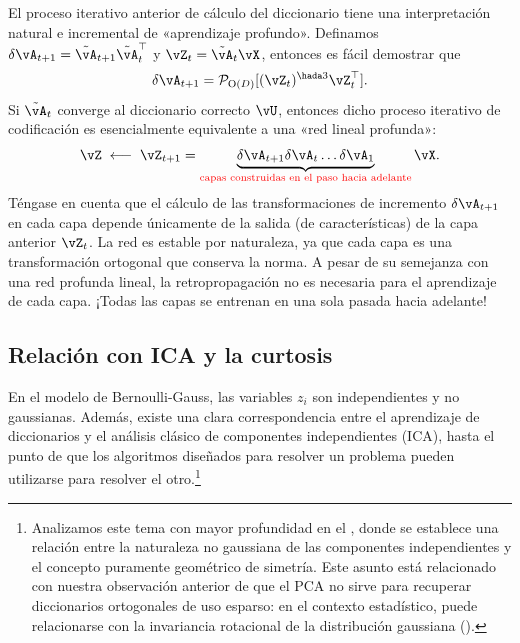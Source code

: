 \documentclass[../../book-main.tex]{subfiles}
\begin{document}
\begin{remark}
    El proceso iterativo anterior de cálculo del diccionario tiene una
    interpretación natural e incremental de «aprendizaje profundo». Definamos
    $\delta \vA_{t+1} = \tilde{\vA}_{t+1}\tilde{\vA}_{t}^\top$ y $\vZ_t
    = \tilde{\vA}_t \vX$, entonces es fácil demostrar que
    $$\delta \vA_{t+1} = \mathcal{P}_{\mathrm O(D)}[(\vZ_t)^{\hada 3}
    \vZ_t^\top].$$
    Si $\tilde{\vA}_t$ converge al diccionario correcto $\vU$, entonces dicho
    proceso iterativo de codificación es esencialmente equivalente a una
    «red lineal profunda»:
    $$\vZ \; \longleftarrow \; \vZ_{t+1} =  \underbrace{\delta
    \vA_{t+1} \delta \vA_{t} \ldots \delta \vA_{1}}_{\color{red}
    \text{capas construidas en el paso hacia adelante}} \vX.$$
    Téngase en cuenta que el cálculo de las transformaciones de incremento $\delta
    \vA_{t+1}$ en cada capa depende únicamente de la salida (de características) de
    la capa anterior $\vZ_t$. La red es estable por naturaleza, ya que
    cada capa es una transformación ortogonal que conserva la norma. A pesar de su
    semejanza con una red profunda lineal, la retropropagación no es
    necesaria para el aprendizaje de cada capa. ¡Todas las capas se entrenan en una 
    sola pasada hacia adelante!
\end{remark}

\subsection{Relación con ICA y la curtosis}
En el modelo de Bernoulli-Gauss, las variables $z_i$ son
independientes y no gaussianas. Además, existe una clara correspondencia
entre el aprendizaje de diccionarios y el análisis clásico de componentes independientes
(ICA), hasta el punto de que los algoritmos diseñados para resolver un problema
pueden utilizarse para resolver el otro.\footnote{Analizamos este tema con
    mayor profundidad en el , donde se
    establece una relación entre la naturaleza no gaussiana de las componentes independientes y
    el concepto puramente geométrico de simetría. Este asunto está
    relacionado con nuestra observación anterior de que el PCA no sirve para
    recuperar diccionarios ortogonales de uso esparso: en el contexto
    estadístico, puede relacionarse con la invariancia rotacional de la distribución gaussiana
().}
\end{document}
